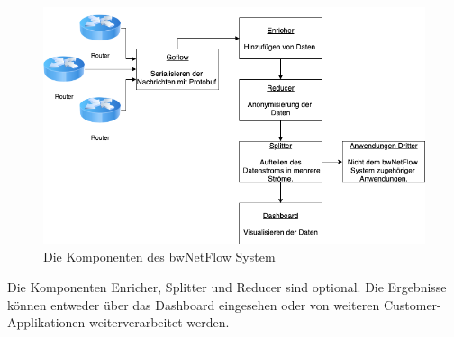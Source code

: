 \documentclass[a4paper, 12pt]{article}
\begin{document}
\begin{figure}[H]
    \centering
    \includegraphics[width=1\textwidth]{images/bwnetflow.png}
    \caption{Die Komponenten des bwNetFlow System}
    \label{fig:bwnetflow}
\end{figure}

Die Komponenten Enricher, Splitter und Reducer sind optional.
Die Ergebnisse können entweder über das Dashboard eingesehen oder von weiteren Customer-Applikationen
weiterverarbeitet werden. 
\end{document}
